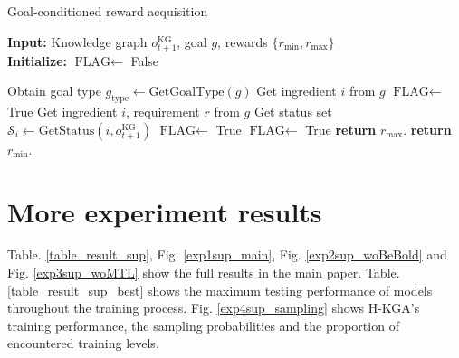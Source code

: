 \documentclass[11pt]{article}
\begin{document}
\begin{algorithm}[t!]
\small
\caption{Goal-conditioned reward acquisition}
\label{algo_GoalReward}
\textbf{Input:} Knowledge graph $o_{t+1}^{\text{KG}}$, goal $g$, rewards $\{ r_{\text{min}}, r_{\text{max}} \}$ \\
\textbf{Initialize:} $\text{FLAG} \leftarrow$ False
\begin{algorithmic}[1]
\State Obtain goal type $g_{\text{type}} \leftarrow \text{GetGoalType}(g)$
    \State Get ingredient $i$ from $g$
        \State $\text{FLAG} \leftarrow$ True
    \EndIf
{}
    \State Get ingredient $i$, requirement $r$ from $g$
    \State Get status set $\mathcal{S}_i \leftarrow \text{GetStatus}(i, o_{t+1}^{\text{KG}})$
        \State $\text{FLAG} \leftarrow$ True
    \EndIf
\Else
        \State $\text{FLAG} \leftarrow$ True
    \EndIf
\EndIf
{}
    \State \textbf{return} $r_{\text{max}}$.
\Else
    \State \textbf{return} $r_{\text{min}}$.
\EndIf
\end{algorithmic}
\end{algorithm}


\clearpage

\section{More experiment results \label{appendix_more_exp_results}}

Table. \ref{table_result_sup}, Fig. \ref{exp1sup_main}, Fig. \ref{exp2sup_woBeBold} and Fig. \ref{exp3sup_woMTL} show the full results in the main paper. 
Table. \ref{table_result_sup_best} shows the maximum testing performance of models throughout the training process. 
Fig. \ref{exp4sup_sampling} shows H-KGA's training performance, the sampling probabilities and the proportion of encountered training levels. 
\end{document}
